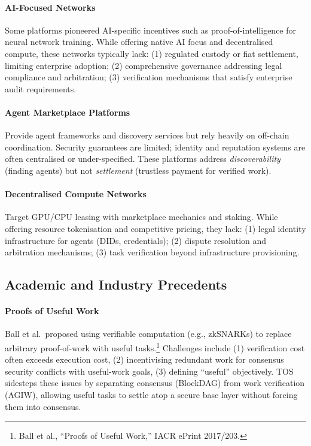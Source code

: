 \documentclass[11pt]{article}
\begin{document}
\paragraph{AI-Focused Networks} Some platforms pioneered AI-specific incentives such as proof-of-intelligence for neural network training. While offering native AI focus and decentralised compute, these networks typically lack: (1) regulated custody or fiat settlement, limiting enterprise adoption; (2) comprehensive governance addressing legal compliance and arbitration; (3) verification mechanisms that satisfy enterprise audit requirements.

\paragraph{Agent Marketplace Platforms} Provide agent frameworks and discovery services but rely heavily on off-chain coordination. Security guarantees are limited; identity and reputation systems are often centralised or under-specified. These platforms address \emph{discoverability} (finding agents) but not \emph{settlement} (trustless payment for verified work).

\paragraph{Decentralised Compute Networks} Target GPU/CPU leasing with marketplace mechanics and staking. While offering resource tokenisation and competitive pricing, they lack: (1) legal identity infrastructure for agents (DIDs, credentials); (2) dispute resolution and arbitration mechanisms; (3) task verification beyond infrastructure provisioning.

\subsection{Academic and Industry Precedents}
\paragraph{Proofs of Useful Work} Ball et al.\ proposed using verifiable computation (e.g., zkSNARKs) to replace arbitrary proof-of-work with useful tasks.\footnote{Ball et al., ``Proofs of Useful Work,'' IACR ePrint 2017/203.} Challenges include (1) verification cost often exceeds execution cost, (2) incentivising redundant work for consensus security conflicts with useful-work goals, (3) defining ``useful'' objectively. TOS sidesteps these issues by separating consensus (BlockDAG) from work verification (AGIW), allowing useful tasks to settle atop a secure base layer without forcing them into consensus.
\end{document}

